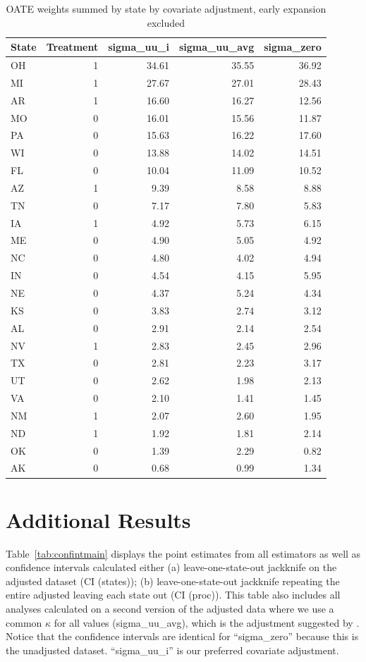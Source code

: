 \documentclass{article}
\begin{document}
\begin{appendix}
\begin{table}[ht]
\centering
\caption{OATE weights summed by state by covariate adjustment, early expansion excluded}
\label{tab:oatestateweightsc2}
\begin{tabular}{lrrrr}
  \hline
State & Treatment & sigma\_uu\_i & sigma\_uu\_avg & sigma\_zero \\ 
  \hline
OH & 1 & 34.61 & 35.55 & 36.92 \\ 
  MI & 1 & 27.67 & 27.01 & 28.43 \\ 
  AR & 1 & 16.60 & 16.27 & 12.56 \\ 
  MO & 0 & 16.01 & 15.56 & 11.87 \\ 
  PA & 0 & 15.63 & 16.22 & 17.60 \\ 
  WI & 0 & 13.88 & 14.02 & 14.51 \\ 
  FL & 0 & 10.04 & 11.09 & 10.52 \\ 
  AZ & 1 & 9.39 & 8.58 & 8.88 \\ 
  TN & 0 & 7.17 & 7.80 & 5.83 \\ 
  IA & 1 & 4.92 & 5.73 & 6.15 \\ 
  ME & 0 & 4.90 & 5.05 & 4.92 \\ 
  NC & 0 & 4.80 & 4.02 & 4.94 \\ 
  IN & 0 & 4.54 & 4.15 & 5.95 \\ 
  NE & 0 & 4.37 & 5.24 & 4.34 \\ 
  KS & 0 & 3.83 & 2.74 & 3.12 \\ 
  AL & 0 & 2.91 & 2.14 & 2.54 \\ 
  NV & 1 & 2.83 & 2.45 & 2.96 \\ 
  TX & 0 & 2.81 & 2.23 & 3.17 \\ 
  UT & 0 & 2.62 & 1.98 & 2.13 \\ 
  VA & 0 & 2.10 & 1.41 & 1.45 \\ 
  NM & 1 & 2.07 & 2.60 & 1.95 \\ 
  ND & 1 & 1.92 & 1.81 & 2.14 \\ 
  OK & 0 & 1.39 & 2.29 & 0.82 \\ 
  AK & 0 & 0.68 & 0.99 & 1.34 \\ 
   \hline
\end{tabular}
\end{table}

\section{Additional Results}
\label{ssec:allresults}

Table~\ref{tab:confintmain} displays the point estimates from all estimators as well as confidence intervals calculated either (a) leave-one-state-out jackknife on the adjusted dataset (CI (states)); (b) leave-one-state-out jackknife repeating the entire adjusted leaving each state out (CI (proc)). This table also includes all analyses calculated on a second version of the adjusted data where we use a common $\kappa$ for all values (sigma\_uu\_avg), which is the adjustment suggested by \cite{carroll2006measurement}. Notice that the confidence intervals are identical for ``sigma\_zero'' because this is the unadjusted dataset. ``sigma\_uu\_i'' is our preferred covariate adjustment.


\end{appendix}
\end{document}
